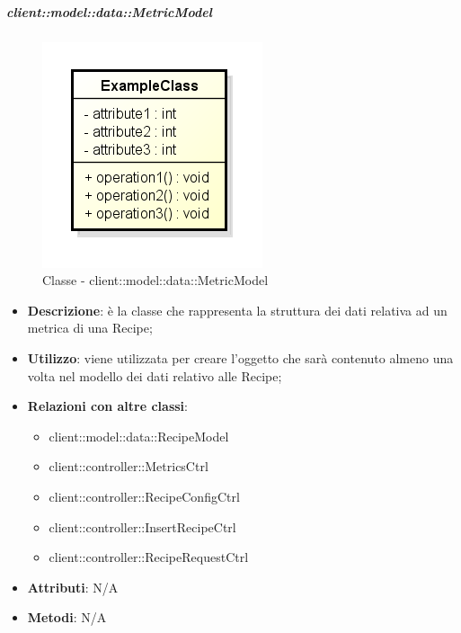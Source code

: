 		\subparagraph{client::model::data::MetricModel} %
		\label{subp:client_model_data_metricmodel}
			\begin{figure}[htbp]
				\centering
				\centerline{\includegraphics[scale=0.7]{./images/client/classes/example_class.png}}
				\caption{Classe - client::model::data::MetricModel}
			\end{figure}
			\begin{itemize}
				\item \textbf{Descrizione}: è la classe che rappresenta la struttura dei dati relativa ad un metrica di una Recipe;
				\item \textbf{Utilizzo}: viene utilizzata per creare l'oggetto che sarà contenuto almeno una volta nel modello dei dati relativo alle Recipe;
				\item \textbf{Relazioni con altre classi}:
					\begin{itemize}
						\item client::model::data::RecipeModel
						\item client::controller::MetricsCtrl
						\item client::controller::RecipeConfigCtrl
						\item client::controller::InsertRecipeCtrl
						\item client::controller::RecipeRequestCtrl
					\end{itemize}
				\item \textbf{Attributi}: N/A
				\item \textbf{Metodi}: N/A
			\end{itemize}

